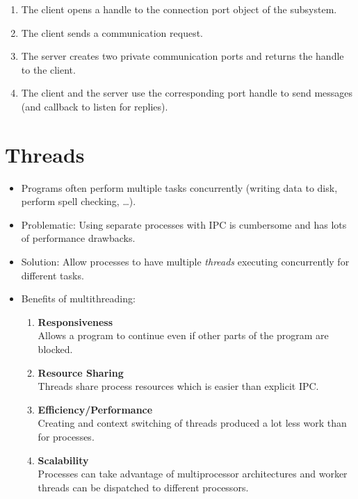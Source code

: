 	            \begin{enumerate}
	            	\item The client opens a handle to the connection port object of the subsystem.
	            	\item The client sends a communication request.
	            	\item The server creates two private communication ports and returns the handle to the client.
	            	\item The client and the server use the corresponding port handle to send messages (and callback to listen for replies).
	            \end{enumerate}

\chapter{Threads}
    \begin{itemize}
    	\item Programs often perform multiple tasks concurrently (writing data to disk, perform spell checking, \dots).
    	\item Problematic: Using separate processes with IPC is cumbersome and has lots of performance drawbacks.
    	\item Solution: Allow processes to have multiple \textit{threads} executing concurrently for different tasks.
    	\item Benefits of multithreading:
	    	\begin{enumerate}
	    		\item \textbf{Responsiveness} \\ Allows a program to continue even if other parts of the program are blocked.
	    		\item \textbf{Resource Sharing} \\ Threads share process resources which is easier than explicit IPC.
	    		\item \textbf{Efficiency/Performance} \\ Creating and context switching of threads produced a lot less work than for processes.
	    		\item \textbf{Scalability} \\ Processes can take advantage of multiprocessor architectures and worker threads can be dispatched to different processors.
	    	\end{enumerate}
    \end{itemize}

